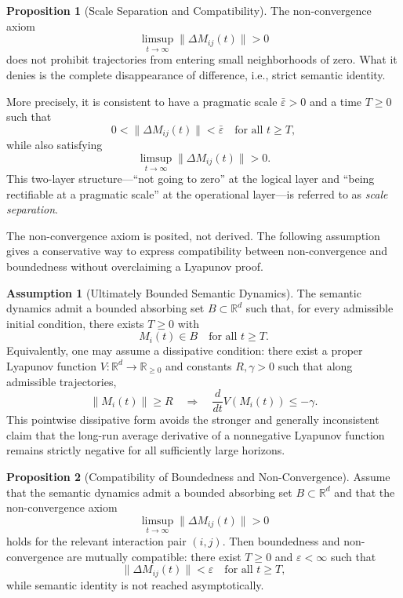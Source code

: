 \documentclass[11pt,a4paper]{article}
\theoremstyle{definition}
\newtheorem{proposition}{Proposition}[section]
\newtheorem{assumption}{Assumption}[section]
\begin{document}
\begin{proposition}[Scale Separation and Compatibility]
The non-convergence axiom
\[
\limsup_{t \to \infty} \|\Delta M_{ij}(t)\| > 0
\]
does not prohibit trajectories from entering small neighborhoods of zero. What it denies is the complete disappearance of difference, i.e., strict semantic identity.

More precisely, it is consistent to have a pragmatic scale $\bar{\varepsilon}>0$ and a time $T\geq 0$ such that
\[
0 < \|\Delta M_{ij}(t)\| < \bar{\varepsilon} \quad \text{for all } t \geq T,
\]
while also satisfying
\[
\limsup_{t \to \infty} \|\Delta M_{ij}(t)\| > 0.
\]
This two-layer structure---``not going to zero'' at the logical layer and ``being rectifiable at a pragmatic scale'' at the operational layer---is referred to as \textit{scale separation}.

The non-convergence axiom is posited, not derived. The following assumption gives a conservative way to express compatibility between non-convergence and boundedness without overclaiming a Lyapunov proof.
\end{proposition}

\begin{assumption}[Ultimately Bounded Semantic Dynamics]
The semantic dynamics admit a bounded absorbing set $B \subset \mathbb{R}^d$ such that, for every admissible initial condition, there exists $T \geq 0$ with
\[
M_i(t) \in B \quad \text{for all } t \geq T.
\]
Equivalently, one may assume a dissipative condition: there exist a proper Lyapunov function
$V:\mathbb{R}^d\to\mathbb{R}_{\geq 0}$ and constants $R,\gamma>0$ such that along admissible trajectories,
\[
\|M_i(t)\| \geq R \quad \Rightarrow \quad \frac{d}{dt}V(M_i(t)) \leq -\gamma.
\]
This pointwise dissipative form avoids the stronger and generally inconsistent claim that the long-run average derivative of a nonnegative Lyapunov function remains strictly negative for all sufficiently large horizons.
\end{assumption}

\begin{proposition}[Compatibility of Boundedness and Non-Convergence]
Assume that the semantic dynamics admit a bounded absorbing set $B \subset \mathbb{R}^d$ and that the non-convergence axiom
\[
\limsup_{t\to\infty}\|\Delta M_{ij}(t)\| > 0
\]
holds for the relevant interaction pair $(i,j)$. Then boundedness and non-convergence are mutually compatible: there exist $T \geq 0$ and $\varepsilon < \infty$ such that
\[
\|\Delta M_{ij}(t)\| < \varepsilon
\quad \text{for all } t \geq T,
\]
while semantic identity is not reached asymptotically.
\end{proposition}
\end{document}
